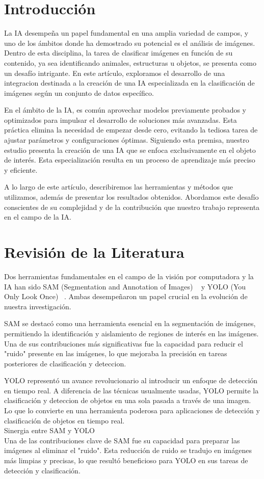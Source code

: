 \documentclass[journal]{IEEEtran}
\begin{document}
\section{Introducción}
La IA desempeña un papel fundamental en una amplia variedad de campos, y uno de los ámbitos donde ha demostrado su potencial es el análisis de imágenes. Dentro de esta disciplina, la tarea de clasificar imágenes en función de su contenido, ya sea identificando animales, estructuras u objetos, se presenta como un desafío intrigante. En este artículo, exploramos el desarrollo de una integracion destinada a la creación de una IA especializada en la clasificación de imágenes según un conjunto de datos específico.

En el ámbito de la IA, es común aprovechar modelos previamente probados y optimizados para impulsar el desarrollo de soluciones más avanzadas. Esta práctica elimina la necesidad de empezar desde cero, evitando la tediosa tarea de ajustar parámetros y configuraciones óptimas. Siguiendo esta premisa, nuestro estudio presenta la creación de una IA que se enfoca exclusivamente en el objeto de interés. Esta especialización resulta en un proceso de aprendizaje más preciso y eficiente.

A lo largo de este artículo, describiremos las herramientas y métodos que utilizamos, además de presentar los resultados obtenidos. Abordamos este desafío conscientes de su complejidad y de la contribución que nuestro trabajo representa en el campo de la IA.

\section{Revisión de la Literatura}
Dos herramientas fundamentales en el campo de la visión por computadora y la IA han sido SAM (Segmentation and Annotation of Images) ~\cite{SAM} y YOLO (You Only Look Once) ~\cite{YOLO}. Ambas desempeñaron un papel crucial en la evolución de nuestra investigación.

SAM se destacó como una herramienta esencial en la segmentación de imágenes, permitiendo la identificación y aislamiento de regiones de interés en las imágenes. Una de sus contribuciones más significativas fue la capacidad para reducir el "ruido" presente en las imágenes, lo que mejoraba la precisión en tareas posteriores de clasificación y deteccion.

YOLO representó un avance revolucionario al introducir un enfoque de detección en tiempo real. A diferencia de las técnicas usualmente usadas, YOLO permite la clasificación y deteccion de objetos en una sola pasada a través de una imagen. Lo que lo convierte en una herramienta poderosa para aplicaciones de detección y clasificación de objetos en tiempo real.
\\
Sinergia entre SAM y YOLO
\\
Una de las contribuciones clave de SAM fue su capacidad para preparar las imágenes al eliminar el "ruido". Esta reducción de ruido se tradujo en imágenes más limpias y precisas, lo que resultó beneficioso para YOLO en sus tareas de detección y clasificación.
\end{document}
